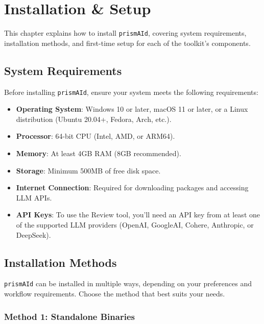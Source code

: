 \chapter{Installation \& Setup}
\label{chap:install}

This chapter explains how to install \texttt{prismAId}, covering system requirements, installation methods, and first-time setup for each of the toolkit's components.

\section{System Requirements}

Before installing \texttt{prismAId}, ensure your system meets the following requirements:

\begin{itemize}
    \item \textbf{Operating System}: Windows 10 or later, macOS 11 or later, or a Linux distribution (Ubuntu 20.04+, Fedora, Arch, etc.).
    \item \textbf{Processor}: 64-bit CPU (Intel, AMD, or ARM64).
    \item \textbf{Memory}: At least 4GB RAM (8GB recommended).
    \item \textbf{Storage}: Minimum 500MB of free disk space.
    \item \textbf{Internet Connection}: Required for downloading packages and accessing LLM APIs.
    \item \textbf{API Keys}: To use the Review tool, you'll need an API key from at least one of the supported LLM providers (OpenAI, GoogleAI, Cohere, Anthropic, or DeepSeek).
\end{itemize}

\section{Installation Methods}

\texttt{prismAId} can be installed in multiple ways, depending on your preferences and workflow requirements. Choose the method that best suits your needs.

\subsection{Method 1: Standalone Binaries}

